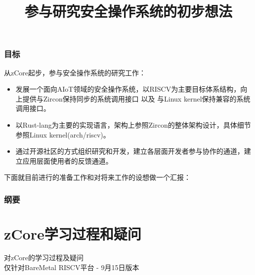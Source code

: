 \documentclass[
8pt, %
]{beamer}
\title{参与研究安全操作系统的初步想法}
\institute[Massclouds]{\large 乾云科技}
\begin{document}
	\renewcommand\arraystretch{2}

	\begin{frame}
		\titlepage
	\end{frame}

	\begin{frame}
		\frametitle{目标}
		{\large 从zCore起步，参与安全操作系统的研究工作：}
		\begin{itemize}
			\item {\large 发展一个面向AIoT领域的安全操作系统，以RISCV为主要目标体系结构，向上提供与Zircon保持同步的系统调用接口 以及 与Linux kernel保持兼容的系统调用接口。}
			\item {\large 以Rust-lang为主要的实现语言，架构上参照Zircon的整体架构设计，具体细节参照Linux kernel(arch/riscv)。}
			\item {\large 通过开源社区的方式组织研究和开发，建立各层面开发者参与协作的通道，建立应用层面使用者的反馈通道。}
		\end{itemize}
		{\large 下面就目前进行的准备工作和对将来工作的设想做一个汇报：}
	\end{frame}

	\begin{frame}
		\frametitle{纲要}
		\tableofcontents
	\end{frame}

	\section{zCore学习过程和疑问}

	\begin{frame}
		\begin{center}
			{\LARGE 对zCore的学习过程及疑问\\}
			\bigskip\bigskip
			{\large 仅针对BareMetal RISCV平台 - 9月15日版本}
		\end{center}
	\end{frame}
\end{document}
